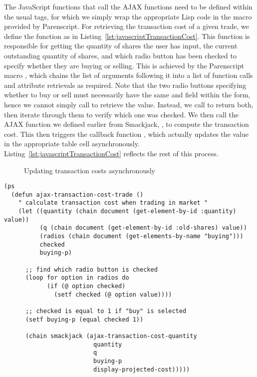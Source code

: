 The JavaScript functions that call the AJAX functions need to be defined within
the usual  tags, for which we simply wrap the appropriate Lisp
code in the  macro provided by Parenscript. For retrieving
the transaction cost of a given trade, we define the function
 as in
Listing~\ref{lst:javascriptTransactionCost}. This function is responsible for
getting the quantity of shares the user has input, the current outstanding
quantity of shares, and which radio button has been checked to specify whether
they are buying or selling. This is achieved by the Parenscript macro
, which chains the list of arguments following it into a list of
function calls and attribute retrievals as required. Note that the two radio
buttons specifying whether to buy or sell must necessarily have the same
 and  field within the form, hence we cannot simply call
 to retrieve the value. Instead, we call
 to return both, then iterate through them to verify
which one was checked. We then call the AJAX function we defined earlier from
Smackjack, , to compute the transaction
cost. This then triggers the callback function ,
which actually updates the value in the appropriate table cell asynchronously.
Listing~\ref{lst:javascriptTransactionCost} reflects the rest of this process.

\begin{figure}[htp]

	\caption{Updating transaction costs asynchronously}
\end{figure}

\begin{lstlisting}[float,
	label={lst:javascriptTransactionCost},
	caption={Calling the AJAX function asynchronously}]
(ps
  (defun ajax-transaction-cost-trade ()
	" calculate transaction cost when trading in market "
	(let ((quantity (chain document (get-element-by-id :quantity) value))
		  (q (chain document (get-element-by-id :old-shares) value))
		  (radios (chain document (get-elements-by-name "buying")))
		  checked
		  buying-p)

	  ;; find which radio button is checked
	  (loop for option in radios do
			(if (@ option checked)
			  (setf checked (@ option value))))

	  ;; checked is equal to 1 if "buy" is selected
	  (setf buying-p (equal checked 1))

	  (chain smackjack (ajax-transaction-cost-quantity
						 quantity
						 q
						 buying-p
						 display-projected-cost)))))
\end{lstlisting}

